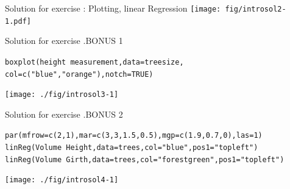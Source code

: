 \documentclass[xcolor=table,       handout,    xcolor=dvipsnames]{beamer}\usepackage[]{graphicx}\usepackage[]{color}
\makeatletter
\newcommand{\hlnum}[1]{\textcolor[rgb]{0,0,0}{#1}}
\newcommand{\hlstr}[1]{\textcolor[rgb]{0.545,0.137,0.137}{#1}}
\newcommand{\hlopt}[1]{\textcolor[rgb]{0,0,0}{#1}}
\newcommand{\hlstd}[1]{\textcolor[rgb]{0,0,0}{#1}}
\newcommand{\hlkwc}[1]{\textcolor[rgb]{1,0,1}{#1}}
\newcommand{\hlkwd}[1]{\textcolor[rgb]{0,0,1}{#1}}
\newenvironment{kframe}{%
 \def\at@end@of@kframe{}%
 \ifinner\ifhmode%
  \def\at@end@of@kframe{\end{minipage}}%
  \begin{minipage}{\columnwidth}%
 \fi\fi%
 \def\FrameCommand##1{\hskip\@totalleftmargin \hskip-\fboxsep
 \colorbox{shadecolor}{##1}\hskip-\fboxsep
     \hskip-\linewidth \hskip-\@totalleftmargin \hskip\columnwidth}%
 \MakeFramed {\advance\hsize-\width
   \@totalleftmargin\z@ \linewidth\hsize
   \@setminipage}}%
 {\par\unskip\endMakeFramed%
 \at@end@of@kframe}
\newenvironment{knitrout}{}{} %
\newcounter{exercisecount}
\makeatother
\begin{document}

\begin{frame}[fragile]{Solution for exercise : Plotting, linear Regression}
\texttt{[image: fig/introsol2-1.pdf]}
\end{frame}


\begin{frame}[fragile]{Solution for exercise .BONUS 1}
\begin{knitrout}
\color{fgcolor}\begin{kframe}
\begin{alltt}
\hlkwd{boxplot}\hlstd{(height}\hlopt{~}\hlstd{measurement,} \hlkwc{data}\hlstd{=treesize,}
        \hlkwc{col}\hlstd{=}\hlkwd{c}\hlstd{(}\hlstr{"blue"}\hlstd{,}\hlstr{"orange"}\hlstd{),} \hlkwc{notch}\hlstd{=}\hlnum{TRUE}\hlstd{)}
\end{alltt}
\end{kframe}

{\centering \texttt{[image: ./fig/introsol3-1]} 

}



\end{knitrout}
\end{frame}


\begin{frame}[fragile]{Solution for exercise .BONUS 2}
\begin{knitrout}\scriptsize
{}\color{fgcolor}\begin{kframe}
\begin{alltt}
\hlkwd{par}\hlstd{(}\hlkwc{mfrow}\hlstd{=}\hlkwd{c}\hlstd{(}\hlnum{2}\hlstd{,}\hlnum{1}\hlstd{),} \hlkwc{mar}\hlstd{=}\hlkwd{c}\hlstd{(}\hlnum{3}\hlstd{,}\hlnum{3}\hlstd{,}\hlnum{1.5}\hlstd{,}\hlnum{0.5}\hlstd{),} \hlkwc{mgp}\hlstd{=}\hlkwd{c}\hlstd{(}\hlnum{1.9}\hlstd{,}\hlnum{0.7}\hlstd{,}\hlnum{0}\hlstd{),} \hlkwc{las}\hlstd{=}\hlnum{1}\hlstd{)}
\hlkwd{linReg}\hlstd{(Volume}\hlopt{~}\hlstd{Height,} \hlkwc{data}\hlstd{=trees,} \hlkwc{col}\hlstd{=}\hlstr{"blue"}\hlstd{,} \hlkwc{pos1}\hlstd{=}\hlstr{"topleft"}\hlstd{)}
\hlkwd{linReg}\hlstd{(Volume}\hlopt{~}\hlstd{Girth,} \hlkwc{data}\hlstd{=trees,} \hlkwc{col}\hlstd{=}\hlstr{"forestgreen"}\hlstd{,} \hlkwc{pos1}\hlstd{=}\hlstr{"topleft"}\hlstd{)}
\end{alltt}
\end{kframe}

{\centering \texttt{[image: ./fig/introsol4-1]} 

}



\end{knitrout}
\end{frame}
\end{document}
